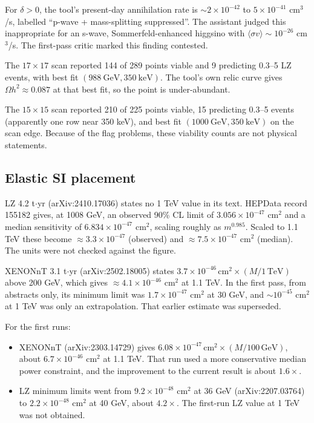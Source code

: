\documentclass[11pt,a4paper]{article}
\begin{document}
For $\delta>0$, the tool's present-day annihilation rate is $\sim2\times10^{-42}$ to $5\times10^{-41}$ cm$^3$/s, labelled ``p-wave + mass-splitting suppressed''. The assistant judged this inappropriate for an s-wave, Sommerfeld-enhanced higgsino with $\langle\sigma v\rangle\sim10^{-26}$ cm$^3$/s. The first-pass critic marked this finding contested.

The $17\times17$ scan reported 144 of 289 points viable and 9 predicting 0.3--5 LZ events, with best fit $(988\ \mathrm{GeV}, 350\ \mathrm{keV})$. The tool's own relic curve gives $\Omega h^2\approx0.087$ at that best fit, so the point is under-abundant.

The $15\times15$ scan reported 210 of 225 points viable, 15 predicting 0.3--5 events (apparently one row near 350 keV), and best fit $(1000\ \mathrm{GeV},350\ \mathrm{keV})$ on the scan edge. Because of the flag problems, these viability counts are not physical statements.

\subsection{Elastic SI placement}
LZ 4.2 t$\cdot$yr (arXiv:2410.17036) states no 1 TeV value in its text. HEPData record 155182 gives, at 1008 GeV, an observed 90\% CL limit of $3.056\times10^{-47}$ cm$^2$ and a median sensitivity of $6.834\times10^{-47}$ cm$^2$, scaling roughly as $m^{0.985}$. Scaled to 1.1 TeV these become $\approx3.3\times10^{-47}$ (observed) and $\approx7.5\times10^{-47}$ cm$^2$ (median). The units were not checked against the figure.

XENONnT 3.1 t$\cdot$yr (arXiv:2502.18005) states $3.7\times10^{-46}\,\mathrm{cm^2}\times(M/1\,\mathrm{TeV})$ above 200 GeV, which gives $\approx4.1\times10^{-46}$ cm$^2$ at 1.1 TeV. In the first pass, from abstracts only, its minimum limit was $1.7\times10^{-47}$ cm$^2$ at 30 GeV, and $\sim10^{-45}$ cm$^2$ at 1 TeV was only an extrapolation. That earlier estimate was superseded.

For the first runs:
\begin{itemize}
\item XENONnT (arXiv:2303.14729) gives $6.08\times10^{-47}\,\mathrm{cm^2}\times(M/100\,\mathrm{GeV})$, about $6.7\times10^{-46}$ cm$^2$ at 1.1 TeV. That run used a more conservative median power constraint, and the improvement to the current result is about $1.6\times$.
\item LZ minimum limits went from $9.2\times10^{-48}$ cm$^2$ at 36 GeV (arXiv:2207.03764) to $2.2\times10^{-48}$ cm$^2$ at 40 GeV, about $4.2\times$. The first-run LZ value at 1 TeV was not obtained.
\end{itemize}
\end{document}
